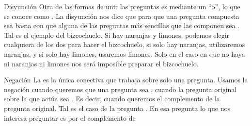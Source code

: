 
\begin{frame}{Disyunción}
  Otra de las formas de unir las preguntas es mediante un ``o'', lo que se
  conoce como .
  \jump
  La disyunción nos dice que para que una pregunta compuesta sea \fulltrue basta
  con que alguna de las preguntas más sencillas que las componen sea \fulltrue.
  \jump
  Tal es el ejemplo del bizcochuelo. Si hay naranjas y limones, podemos elegir
  cualquiera de los dos para hacer el bizcochuelo, si solo hay naranjas,
  utilizaremos naranjas, y si solo hay limones, usaremos limones. Solo en el caso
  en que no haya ni naranjas ni limones nos será imposible preparar el bizcochuelo.
\end{frame}




\begin{frame}{Negación}
  La  es la única conectiva que trabaja sobre solo una
  pregunta.
  \jump
  Usamos la negación cuando queremos que una pregunta sea \fulltrue, cuando
  la pregunta original sobre la que actúa sea \fullfalse. Es decir, cuando
  queremos el complemento de la pregunta original.
  \jump
  Tal es el caso de la pregunta .
  En esa pregunta lo que nos interesa preguntar es por el complemento de 
\end{frame}

